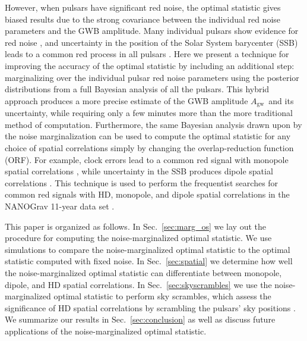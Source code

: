 \documentclass[twocolumn,aps,prd,superscriptaddress]{revtex4-1}
\newcommand{\Agw}{\ensuremath{A_\mathrm{gw}}}
\begin{document}
However, when pulsars have significant red noise, 
the optimal statistic gives biased results 
due to the strong covariance 
between the individual red noise parameters and the GWB amplitude. 
Many individual pulsars show evidence for red noise \citep{lam+2017,abb+17}, 
and uncertainty in the position of the Solar System barycenter (SSB) leads to 
a common red process in all pulsars \citep{abb+17b}. 
Here we present a technique for improving the accuracy of the optimal statistic by including an additional step: 
marginalizing over the individual pulsar red noise parameters 
using the posterior distributions from a full Bayesian analysis of all the pulsars. 
This hybrid approach produces a more precise estimate of the GWB amplitude \Agw\ 
and its uncertainty, while requiring only a few minutes more than the more traditional method of computation. 
Furthermore, the same Bayesian analysis drawn upon by the noise marginalization 
can be used to compute the optimal statistic for any choice of spatial correlations 
simply by changing the overlap-reduction function (ORF). 
For example, clock errors lead to a common red signal with monopole spatial correlations \citep{hcm+2012}, 
while uncertainty in the SSB produces dipole spatial correlations \citep{chm+2010}. 
This technique is used to perform the frequentist searches 
for common red signals with HD, 
monopole, and dipole spatial correlations 
in the NANOGrav 11-year data set \citep{abb+17b}.

This paper is organized as follows. In Sec.~\ref{sec:marg_os} 
we lay out the procedure for computing the noise-marginalized optimal statistic. 
We use simulations to compare the noise-marginalized optimal statistic 
to the optimal statistic computed with fixed noise. 
In Sec.~\ref{sec:spatial} we determine how well 
the noise-marginalized optimal statistic can 
differentiate between monopole, dipole, and HD spatial correlations. 
In Sec.~\ref{sec:skyscrambles} we use the noise-marginalized optimal statistic 
to perform sky scrambles, 
which assess the significance of HD spatial correlations 
by scrambling the pulsars' sky positions \citep{cs2016, tlb+2017}. 
We summarize our results in Sec.~\ref{sec:conclusion} 
as well as discuss future applications of the noise-marginalized optimal statistic.
\end{document}
